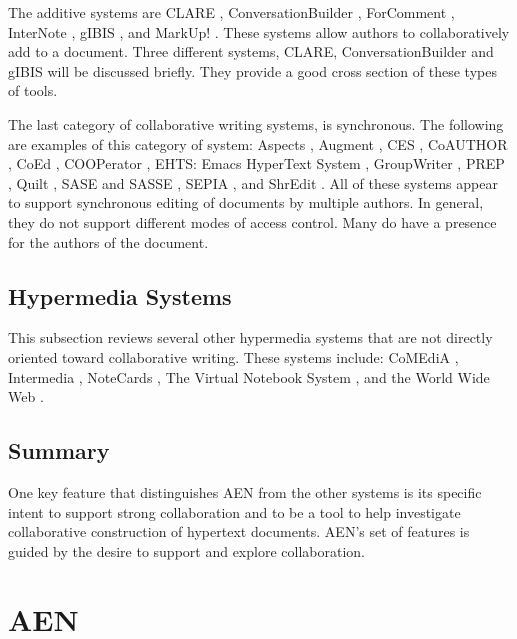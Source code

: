 The additive systems are CLARE \cite{csdl-93-21}, ConversationBuilder
\cite{Kaplan92}, ForComment \cite{Ellis91,Opper88}, InterNote
\cite{Malcolm91}, gIBIS \cite{Conklin88}, and MarkUp! \cite{Allen93}.
These systems allow authors to collaboratively add to a document.  Three
different systems, CLARE, ConversationBuilder and gIBIS will be discussed
briefly.  They provide a good cross section of these types of tools.

The last category of collaborative writing systems, is synchronous.  The
following are examples of this category of system: Aspects
\cite{Allen93,Baecker93}, Augment \cite{Engelbart84}, CES
\cite{Ellis91,Greif87}, CoAUTHOR \cite{Bowers91}, CoEd \cite{Ellis89},
COOPerator \cite{Michels95}, EHTS: Emacs HyperText System \cite{Wiil92},
GroupWriter \cite{Malcolm91,Malcolm93}, PREP \cite{Neuwirth90,Neuwirth92},
Quilt \cite{Fish88}, SASE and SASSE \cite{Baecker93}, SEPIA \cite{Haake92},
and ShrEdit \cite{Cogn92}.  All of these systems appear to support
synchronous editing of documents by multiple authors.  In general, they do
not support different modes of access control.  Many do have a presence for
the authors of the document. 

\subsection{Hypermedia Systems}
\label{sec:hypermedia}

This subsection reviews several other hypermedia systems that are not directly
oriented toward collaborative writing.  These systems include: CoMEdiA
\cite{Santos92a,Santos92b,Santos93a,Santos93b}, Intermedia
\cite{Conklin87},  NoteCards \cite{Halasz87},  The
Virtual Notebook System \cite{Shipman89}, and the World Wide Web
\cite{Berners-Lee94}.

\subsection{Summary}

One key feature that distinguishes AEN from the other systems is its
specific intent to support strong collaboration and to be a tool to help
investigate collaborative construction of hypertext documents.  AEN's set of
features is guided by the desire to support and explore collaboration.




\section{AEN}
\label{sec:AEN}


